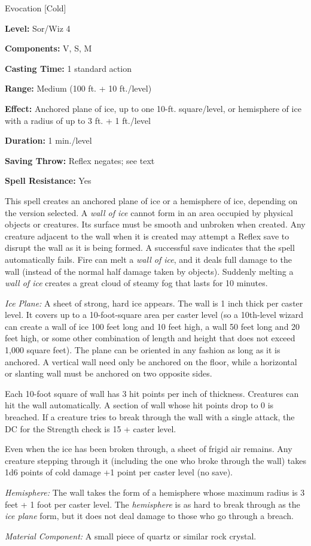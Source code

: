 
Evocation [Cold]

\textbf{Level:} Sor/Wiz 4

\textbf{Components:} V, S, M

\textbf{Casting Time:} 1 standard action

\textbf{Range:} Medium (100 ft. + 10 ft./level)

\textbf{Effect:} Anchored plane of ice, up to one 10-ft. square/level, or hemisphere 
of ice with a radius of up to 3 ft. + 1 ft./level

\textbf{Duration:} 1 min./level

\textbf{Saving Throw:} Reflex negates; see text

\textbf{Spell Resistance:} Yes

This spell creates an anchored plane of ice or a hemisphere of ice, depending on 
the version selected. A \textit{wall of ice} cannot form in an area occupied by 
physical objects or creatures. Its surface must be smooth and unbroken when created. 
Any creature adjacent to the wall when it is created may attempt a Reflex save 
to disrupt the wall as it is being formed. A successful save indicates that the 
spell automatically fails. Fire can melt a \textit{wall of ice}, and it deals full 
damage to the wall (instead of the normal half damage taken by objects). Suddenly 
melting a \textit{wall of ice} creates a great cloud of steamy fog that lasts for 
10 minutes.

\textit{Ice Plane:} A sheet of strong, hard ice appears. The wall is 1 inch thick 
per caster level. It covers up to a 10-foot-square area per caster level (so a 
10th-level wizard can create a wall of ice 100 feet long and 10 feet high, a wall 
50 feet long and 20 feet high, or some other combination of length and height that 
does not exceed 1,000 square feet). The plane can be oriented in any fashion as 
long as it is anchored. A vertical wall need only be anchored on the floor, while 
a horizontal or slanting wall must be anchored on two opposite sides.

Each 10-foot square of wall has 3 hit points per inch of thickness. Creatures can 
hit the wall automatically. A section of wall whose hit points drop to 0 is breached. 
If a creature tries to break through the wall with a single attack, the DC for 
the Strength check is 15 + caster level.

Even when the ice has been broken through, a sheet of frigid air remains. Any creature 
stepping through it (including the one who broke through the wall) takes 1d6 points 
of cold damage +1 point per caster level (no save).

\textit{Hemisphere:} The wall takes the form of a hemisphere whose maximum radius 
is 3 feet + 1 foot per caster level. The \textit{hemisphere} is as hard to break 
through as the \textit{ice plane} form, but it does not deal damage to those who 
go through a breach.

\textit{Material Component:} A small piece of quartz or similar rock crystal.

